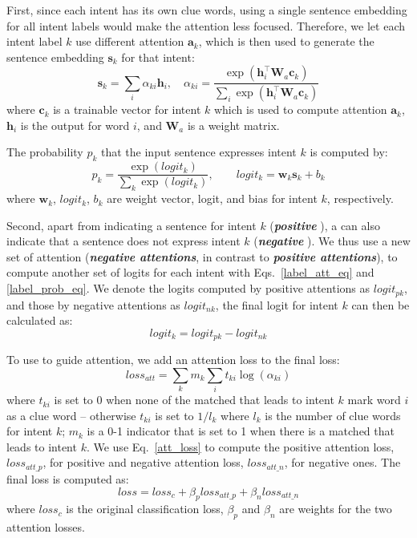 First, since each intent has its own clue words, using a single sentence embedding for all intent labels %
would make the attention less focused.
Therefore, we let each intent label $k$ use different attention $\textbf{a}_k$, which is then used to generate the sentence embedding
$\textbf{s}_k$ for that intent:
\begin{equation}
\textbf{s}_k = \sum_{i}{\alpha_{ki}\textbf{h}_i}, \quad
\alpha_{ki}=\frac{\exp(\textbf{h}_i^\intercal \textbf{W}_a\textbf{c}_k)}{\sum_{i}{\exp(\textbf{h}_i^\intercal \textbf{W}_a\textbf{c}_k)}}
\label{label_att_eq}
\end{equation}
where $\textbf{c}_k$ is a trainable vector for intent $k$ which is used to compute attention $\textbf{a}_k$, $\textbf{h}_i$ is the \BLSTM output for word $i$, and $\textbf{W}_a$ is a weight matrix.

The probability $p_k$ that the input sentence expresses intent $k$ is computed by:
\begin{equation}
p_k = \frac{\exp(logit_k)}{\sum_{k}{\exp(logit_k)}}, \quad\quad logit_k=\textbf{w}_k\textbf{s}_k + b_k
\label{label_prob_eq}
\end{equation}
where $\textbf{w}_k$, $logit_k$, $b_k$ are weight vector, logit, and bias for intent $k$, respectively.

Second, apart from indicating a sentence for intent $k$ (\textbf{\emph{positive \REs}}),
a \RE can also indicate that a sentence does not express intent $k$ (\textbf{\emph{negative \REs}}).
We thus use a new set of attention (\textbf{\emph{negative attentions}}, in contrast to \textbf{\emph{positive attentions}}), to compute
another set of logits for each intent with Eqs.~\ref{label_att_eq} and \ref{label_prob_eq}. We denote the logits computed by positive
attentions as $logit_{pk}$, and those by negative attentions as $logit_{nk}$, the final logit for intent $k$ can then be calculated as:
\begin{equation}
logit_k = logit_{pk} - logit_{nk}
\end{equation}

To use \REs to guide attention, we add an attention loss to the final loss:
\begin{equation}
loss_{att} = \sum_{k}{m_k\sum_{i}{t_{ki}\log(\alpha_{ki})}}
\label{att_loss}
\end{equation}
where $t_{ki}$ is set to $0$ when none of the matched \REs that leads to intent $k$ mark word $i$ as a clue word -- otherwise
$t_{ki}$ is set to $1/l_{k}$ where $l_k$ is the number of clue words
for intent $k$; $m_k$ is a 0-1 indicator that is set to 1 when there is a matched \RE that leads to intent $k$. We use Eq.~\ref{att_loss}
to compute the positive attention loss, $loss_{att\_p}$, for positive \REs and negative attention loss, $loss_{att\_n}$, for negative ones.
The final loss is computed as:
\begin{equation}
loss = loss_{c} + \beta_p loss_{att\_p} + \beta_n loss_{att\_n}
\end{equation}
where $loss_{c}$ is the original classification loss, $\beta_p$ and $\beta_n$ are weights for the two attention losses.

